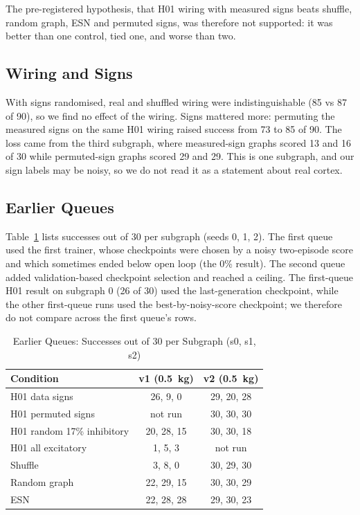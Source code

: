 \documentclass[11pt]{article}
\begin{document}
The pre-registered hypothesis, that H01 wiring with measured signs beats shuffle, random graph, ESN and permuted signs, was therefore not supported: it was better than one control, tied one, and worse than two.

\subsection{Wiring and Signs}
With signs randomised, real and shuffled wiring were indistinguishable (85 vs 87 of 90), so we find no effect of the wiring. Signs mattered more: permuting the measured signs on the same H01 wiring raised success from 73 to 85 of 90. The loss came from the third subgraph, where measured-sign graphs scored 13 and 16 of 30 while permuted-sign graphs scored 29 and 29. This is one subgraph, and our sign labels may be noisy, so we do not read it as a statement about real cortex.

\subsection{Earlier Queues}
Table~\ref{tab:earlier} lists successes out of 30 per subgraph (seeds 0, 1, 2). The first queue used the first trainer, whose checkpoints were chosen by a noisy two-episode score and which sometimes ended below open loop (the 0\% result). The second queue added validation-based checkpoint selection and reached a ceiling. The first-queue H01 result on subgraph 0 (26 of 30) used the last-generation checkpoint, while the other first-queue runs used the best-by-noisy-score checkpoint; we therefore do not compare across the first queue's rows.

\begin{table}[t]
\caption{Earlier Queues: Successes out of 30 per Subgraph (s0, s1, s2)}
\label{tab:earlier}
\centering
\begin{tabular}{lcc}
\toprule
\textbf{Condition} & \textbf{v1 (0.5~kg)} & \textbf{v2 (0.5~kg)}\\
\midrule
H01 data signs & 26, 9, 0 & 29, 20, 28\\
H01 permuted signs & not run & 30, 30, 30\\
H01 random 17\% inhibitory & 20, 28, 15 & 30, 30, 18\\
H01 all excitatory & 1, 5, 3 & not run\\
Shuffle & 3, 8, 0 & 30, 29, 30\\
Random graph & 22, 29, 15 & 30, 30, 29\\
ESN & 22, 28, 28 & 29, 30, 23\\
\bottomrule
\end{tabular}
\end{table}
\end{document}
